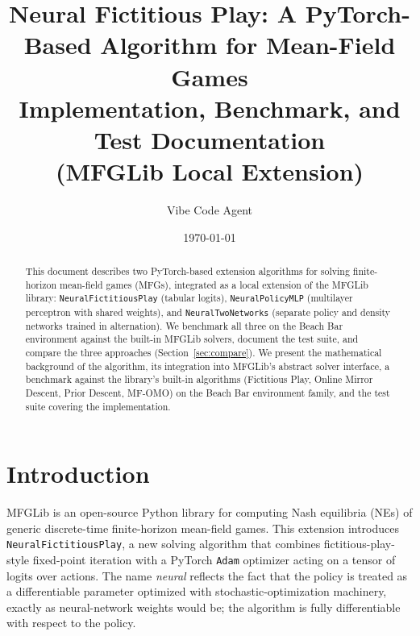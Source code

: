 \documentclass[11pt,a4paper]{article}
\title{Neural Fictitious Play: A PyTorch-Based Algorithm for Mean-Field Games\\
\large Implementation, Benchmark, and Test Documentation\\
\normalsize (MFGLib Local Extension)}
\author{Vibe Code Agent}
\date{\today}
\begin{document}
\maketitle

\begin{abstract}
This document describes two PyTorch-based extension
algorithms for solving finite-horizon mean-field games (MFGs), integrated as a local
extension of the MFGLib library: \texttt{NeuralFictitiousPlay} (tabular logits),
\texttt{NeuralPolicyMLP} (multilayer perceptron with shared weights), and
\texttt{NeuralTwoNetworks} (separate policy and density networks trained in
alternation). We benchmark all three on the Beach Bar environment against the
built-in MFGLib solvers, document the test suite, and compare the three
approaches (Section~\ref{sec:compare}). We present the mathematical background of the
algorithm, its integration into MFGLib's abstract solver interface, a benchmark
against the library's built-in algorithms (Fictitious Play, Online Mirror Descent,
Prior Descent, MF-OMO) on the Beach Bar environment family, and the test suite
covering the implementation.
\end{abstract}

\tableofcontents
\newpage

\section{Introduction}
MFGLib \cite{mfglib} is an open-source Python library for computing Nash
equilibria (NEs) of generic discrete-time finite-horizon mean-field games.
This extension introduces \texttt{NeuralFictitiousPlay}, a new solving algorithm
that combines fictitious-play-style fixed-point iteration \cite{perrin2020} with
a PyTorch \texttt{Adam} optimizer \cite{kingma2014} acting on a tensor of logits
over actions. The name \emph{neural} reflects the fact that the policy is treated
as a differentiable parameter optimized with stochastic-optimization machinery,
exactly as neural-network weights would be; the algorithm is fully differentiable
with respect to the policy.
\end{document}
